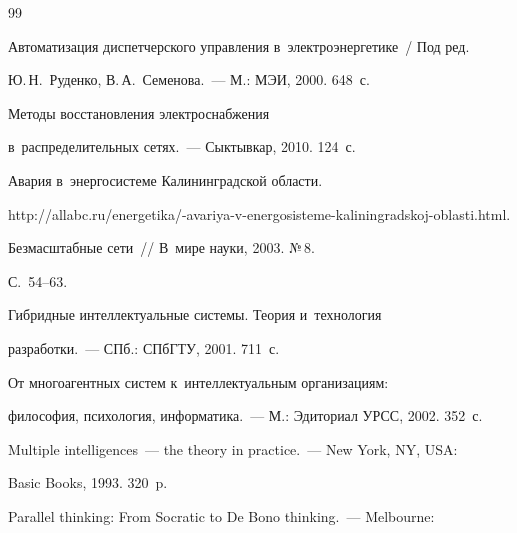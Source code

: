  {\small\frenchspacing


{%




\begin{thebibliography}{99}


 




  Автоматизация диспетчерского управления в~электроэнергетике~/ Под ред. 


Ю.\,Н.~Руденко, В.\,А.~Семенова.~--- М.: МЭИ, 2000. 648~с. 







   Методы восстановления электроснабжения 


в~распределительных сетях.~--- Сыктывкар, 2010. 124~с. 




  Авария в~энергосистеме Калининградской области. {\sf  


http://allabc.ru/energetika/-avariya-v-energosisteme-kaliningradskoj-oblasti.html.}




   Безмасштабные сети~/\!\!/ В~мире науки, 2003. №\,8. 


С.~54--63. 




   Гибридные интеллектуальные системы. Теория и~технология 


разработки.~--- СПб.: СПбГТУ, 2001. 711~с.




   От многоагентных систем к~интеллектуальным организациям: 


философия, психология, информатика.~--- М.: Эдиториал УРСС, 2002. 352~с.




   Multiple intelligences~--- the theory in practice.~--- New York, NY, USA: 


Basic Books, 1993. 320~p.


 




   Parallel thinking: From Socratic to De Bono thinking.~--- Melbourne: 



\end{thebibliography}}}
